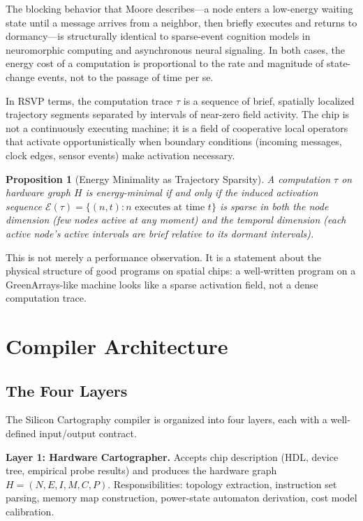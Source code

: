 \documentclass[11pt, a4paper]{article}
\newtheorem{proposition}{Proposition}
\begin{document}
The blocking behavior that Moore describes---a node enters a low-energy waiting state
until a message arrives from a neighbor, then briefly executes and returns to
dormancy---is structurally identical to sparse-event cognition models in neuromorphic
computing and asynchronous neural signaling. In both cases, the energy cost of a
computation is proportional to the rate and magnitude of state-change events, not
to the passage of time per se.

In RSVP terms, the computation trace $\tau$ is a sequence of brief, spatially localized
trajectory segments separated by intervals of near-zero field activity. The chip is
not a continuously executing machine; it is a field of cooperative local operators that
activate opportunistically when boundary conditions (incoming messages, clock edges,
sensor events) make activation necessary.

\begin{proposition}[Energy Minimality as Trajectory Sparsity]
A computation $\tau$ on hardware graph $H$ is energy-minimal if and only if the
induced activation sequence $\mathcal{E}(\tau) = \{(n, t) : n \text{ executes at time } t\}$
is sparse in both the node dimension (few nodes active at any moment) and the temporal
dimension (each active node's active intervals are brief relative to its dormant intervals).
\end{proposition}

This is not merely a performance observation. It is a statement about the physical
structure of good programs on spatial chips: a well-written program on a GreenArrays-like
machine looks like a sparse activation field, not a dense computation trace.

\section{Compiler Architecture}

\subsection{The Four Layers}

The Silicon Cartography compiler is organized into four layers, each with a well-defined
input/output contract.

\textbf{Layer 1: Hardware Cartographer.} Accepts chip description (HDL, device tree,
empirical probe results) and produces the hardware graph $H = (N, E, I, M, C, P)$.
Responsibilities: topology extraction, instruction set parsing, memory map construction,
power-state automaton derivation, cost model calibration.
\end{document}

